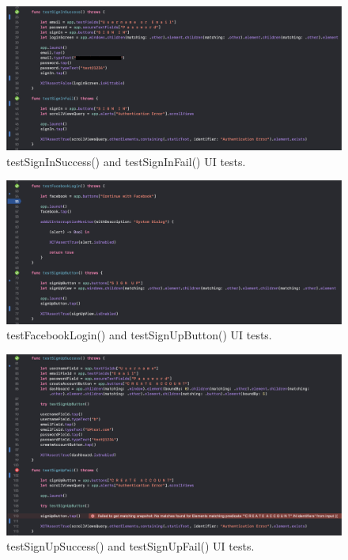 \begin{figure}[H]
    \centering
    \includegraphics[width=\textwidth]{./graphics/testing/testing1.png}
    \caption{testSignInSuccess() and testSignInFail() UI tests.}
    \label{fig:testing1}
\end{figure}

\begin{figure}[H]
    \centering
    \includegraphics[width=\textwidth]{./graphics/testing/testing2.png}
    \caption{testFacebookLogin() and testSignUpButton() UI tests.}
    \label{fig:testing2}
\end{figure}

\begin{figure}[H]
    \centering
    \includegraphics[width=\textwidth]{./graphics/testing/testing3.png}
    \caption{testSignUpSuccess() and testSignUpFail() UI tests.}
    \label{fig:testing3}
\end{figure}


